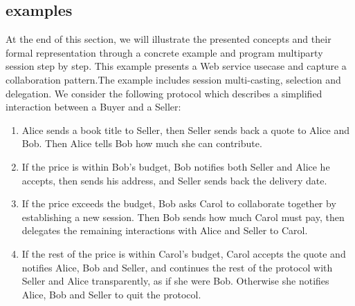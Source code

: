 \documentclass[a4paper]{article}
\begin{document}
\subsection{examples}
At the end of this section, we will illustrate the presented concepts and their formal representation through a concrete example and program multiparty session step by step. This example presents a Web service usecase and capture a collaboration pattern.The example includes session multi-casting, selection and delegation. We consider the following protocol which describes a simplified interaction between a Buyer and a Seller:
\begin{enumerate}
\item Alice sends a book title to Seller, then Seller sends back a quote to Alice and Bob. Then Alice tells Bob how much she can contribute.
\item If the price is within Bob’s budget, Bob notifies both Seller and Alice he accepts, then sends his address, and Seller sends back the delivery date.
\item If the price exceeds the budget, Bob asks Carol to collaborate together by establishing a new session. Then Bob sends how much Carol must pay, then delegates the remaining interactions with Alice and Seller to Carol.
\item If the rest of the price is within Carol’s budget, Carol accepts the quote and notifies Alice, Bob and Seller, and continues the rest of the protocol with Seller and Alice transparently, as if she were Bob. Otherwise she notifies Alice, Bob and Seller to quit the protocol.
\end{enumerate}
\end{document}
